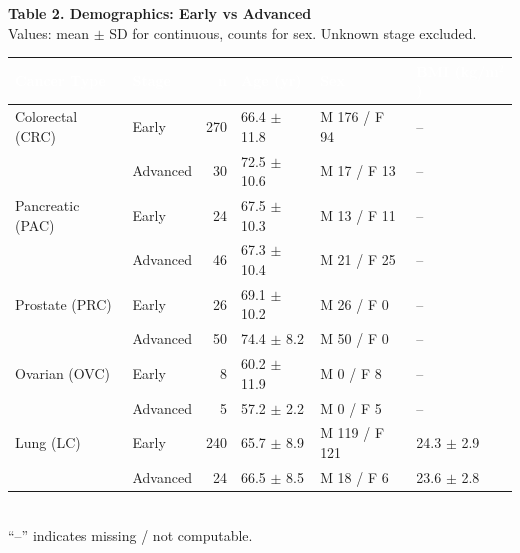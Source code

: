 \documentclass[12pt]{article}
\begin{document}
\vspace*{4mm}
{\LARGE\bfseries\color{headblue} Table 2. Demographics: Early vs Advanced}\\[2mm]
{\large\color{textmute} Values: mean $\pm$ SD for continuous, counts for sex. Unknown stage excluded.}\\[4mm]
{\Large
\begin{tabular}{>{\raggedright\arraybackslash}p{5.5cm} l r l l l}
\toprule
\rowcolor{headblue}
\textcolor{white}{\textbf{Cancer Type}} &
\textcolor{white}{\textbf{Stage}} &
\textcolor{white}{\textbf{n}} &
\textcolor{white}{\textbf{Age (yr)}} &
\textcolor{white}{\textbf{Sex}} &
\textcolor{white}{\textbf{BMI (kg/m$^2$)}} \\
\midrule
Colorectal (CRC) & Early & 270 & 66.4 $\pm$ 11.8 & M 176 / F 94 & -- \\
 & Advanced & 30 & 72.5 $\pm$ 10.6 & M 17 / F 13 & -- \\
\midrule
Pancreatic (PAC) & Early & 24 & 67.5 $\pm$ 10.3 & M 13 / F 11 & -- \\
 & Advanced & 46 & 67.3 $\pm$ 10.4 & M 21 / F 25 & -- \\
\midrule
Prostate (PRC) & Early & 26 & 69.1 $\pm$ 10.2 & M 26 / F 0 & -- \\
 & Advanced & 50 & 74.4 $\pm$ 8.2 & M 50 / F 0 & -- \\
\midrule
Ovarian (OVC) & Early & 8 & 60.2 $\pm$ 11.9 & M 0 / F 8 & -- \\
 & Advanced & 5 & 57.2 $\pm$ 2.2 & M 0 / F 5 & -- \\
\midrule
Lung (LC) & Early & 240 & 65.7 $\pm$ 8.9 & M 119 / F 121 & 24.3 $\pm$ 2.9 \\
 & Advanced & 24 & 66.5 $\pm$ 8.5 & M 18 / F 6 & 23.6 $\pm$ 2.8 \\
\bottomrule
\end{tabular}
}
\\[5mm]
{\small\color{textmute}
``--'' indicates missing / not computable.}
\end{document}
